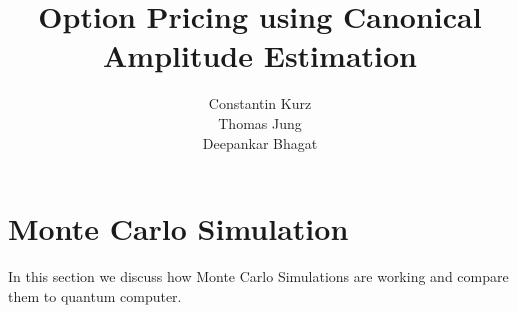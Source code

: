 \documentclass[a4paper, 12pt, one column, aas_macros]{article}
\title{Option Pricing using Canonical Amplitude Estimation}
\author{Constantin Kurz \\ Thomas Jung \\ Deepankar Bhagat}
\begin{document}
\maketitle




\section{Monte Carlo Simulation}    
In this section we discuss how Monte Carlo Simulations are working and compare them to quantum computer.







\end{document}
